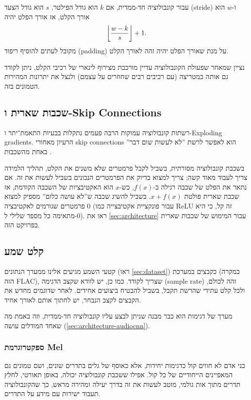 \documentclass[hebrew, a4paper]{article}
\theoremstyle{plain}
\theoremstyle{definition}
\numberwithin{equation}{section}
\DeclarePairedDelimiter\floor{\lfloor}{\rfloor}
\begin{document}
עבור קונבולוציה חד-ממדית, אם $k$ הוא גודל הפילטר, $s$ הוא גודל הצעד
(stride) ו-$w$ הוא אורך הקלט, אז אורך הפלט יהיה
\[
  \floor*{\frac{w-k}{s}} + 1.
\]
מקובל לעתים להוסיף ריפוד (padding) על מנת שאורך הפלט יהיה זהה לאורך
הקלט.

נציין שמאחר שפעולת הקונבולוציה עדיין מורכבת מצירוף לינארי של רכיבי
הקלט, ניתן לקודד גם אותה כמטריצה (עם רכיבים רבים שחוזרים על עצמם)
ולנצל את יתרונות המהירות הטמונים בזה.

\subsection{שכבות שארית ו-Skip Connections}
\label{sec:skip-connections}

רשתות קונבולוציה עמוקות הרבה פעמים נתקלות בבעיות התאמת־יתר
ו-Exploding gradients. הרעיון מאחורי skip connections הוא לאפשר לרשת
”לא לעשות שום דבר” באחת מהשכבות .

בשכבת קונבולוציה מסורתית, בשביל לקבל פרמטרים שלא משנים את הקלט, תהליך
הלמידה צריך לעבוד מאוד קשה; צריך למצוא בדיוק את הפרמטרים הנכונים בשביל
לעשות את זה. אם נתאר את הפלט של שכבה רגילה כ-$f(x)$, כש-$x$ הוא
האקטיבציות של השכבה הקודמת, אז שכבת שארית פולטת $x + f(x)$. בשביל
להשיג שכבה ש”לא עושה כלום” מספיק למצוא פרמטרים שגורמים לאקטיבציה $0$
(עבור פונקציית אקטיבצייה כמו ReLU זה קל, כי היא מתאימה כל מספר שלילי
ל-$0$). ראו את \autoref{sec:architecture} עבור המימוש של שכבות שארית
בפרויקט הזה.

\subsection{קלט שמע}
\label{sec:audio-input}

קטעי השמע מגיעים אלינו ממערך הנתונים (ראו \autoref{sec:dataset})
כקבצים במערכת (במקרה הזה FLAC), שצריך לקודד. כמו כן, יש לוודא שקצב
הדגימה (sample rate) זהה לכולם, ולכל קלט עתידי שהרשת תקבל, בשביל
להבטיח ביצועים אחידים. לאחר שדוגמים מחדש את הקבצים לקצב הנבחר, יש
לחתוך אותם לאורך אחיד.

מערך של דגימות הוא כבר מבנה שניתן לבצע עליו קונבולוציה חד-ממדית, וזה
באמת מה שאחד המודלים עושה (\autoref{sec:architecture-audiocnn}).

\subsubsection{ספקטרוגרמת Mel}
\label{sec:mel-spectrogram}

בני אדם לא חווים קול כדגימות יחידות, אלא כאוסף של גלים בתדרים שונים,
ושם טמונים גם המאפיינים הייחודיים של כל קול. אפילו ששכבת קונבולוציה
יכולה, באופן תאורטי, לחלץ תדרים מתוך אות גולמי, מוטב לעשות את זה בדרך
יעילה ומהירה מראש, כך שהקונבולוציה תעבוד ישירות עם מידע על התדרים.
\end{document}
